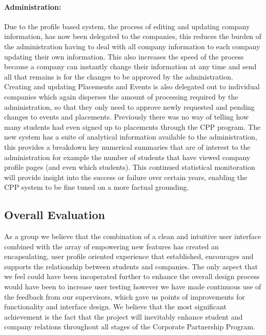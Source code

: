 \paragraph{Administration:}
	Due to the profile based system, the process of editing and updating company information, has now been delegated to the companies, this reduces the burden of the administration having to deal with all company information to each company updating their own information. This also increases the speed of the process because a company can instantly change their information at any time and send all that remains is for the changes to be approved by the administration.
	Creating and updating Placements and Events is also delegated out to individual companies which again disperses the amount of processing required by the administration, so that they only need to approve newly requested and pending changes to events and placements.
	Previously there was no way of telling how many students had even signed up to placements through the CPP program. The new system has a suite of analytical information available to the administration, this provides a breakdown key numerical summaries that are of interest to the administration for example the number of students that have viewed company profile pages (and even which students). This continued statistical monitoration will provide insight into the success or failure over certain years, enabling the CPP system to be fine tuned on a more factual grounding. 

\subsection{Overall Evaluation}
	As a group we believe that the combination of a clean and intuitive user interface combined with the array of empowering new features has created an encapsulating, user profile oriented experience that established, encourages and supports the relationship between students and companies.
	The only aspect that we feel could have been incoperated further to enhance the overall design process would have been to increase user testing however we have made continuous use of the feedback from our supervisors, which gave us points of improvements for functionality and interface design.
	We believe that the most significant achievement is the fact that the project will inevitably enhance student and company relations throughout all stages of the Corporate Partnership Program.
